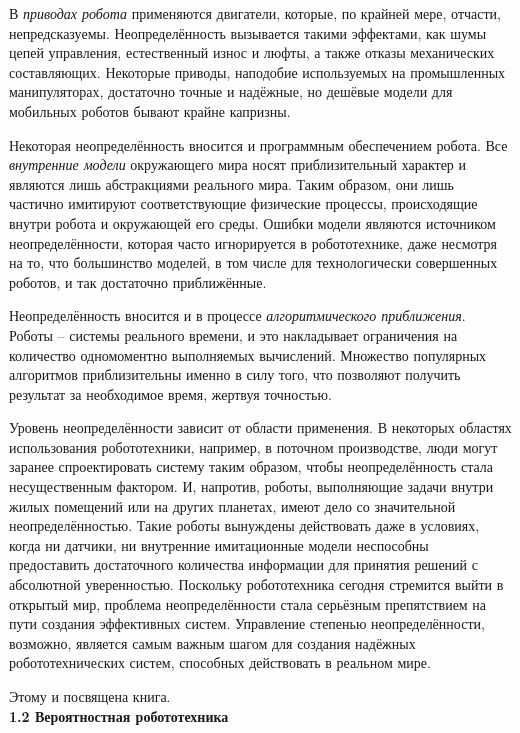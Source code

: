 \documentclass[10pt,a4paper]{article}
\begin{document}
В \textit{приводах робота} применяются двигатели, которые, по крайней мере, отчасти, непредсказуемы. Неопределённость вызывается такими эффектами, как шумы цепей управления, естественный износ и люфты, а также отказы механических составляющих. Некоторые приводы, наподобие используемых на промышленных манипуляторах, достаточно точные и надёжные, но дешёвые модели для мобильных роботов бывают крайне капризны.

Некоторая неопределённость вносится и программным обеспечением робота. Все \textit{внутренние модели} окружающего мира носят приблизительный характер и являются лишь абстракциями реального мира. Таким образом, они лишь частично имитируют соответствующие физические процессы, происходящие внутри робота и окружающей его среды. Ошибки модели являются источником неопределённости, которая часто игнорируется в робототехнике, даже несмотря на то, что большинство моделей, в том числе для технологически совершенных роботов, и так достаточно приближённые.

Неопределённость вносится и в процессе \textit{алгоритмического приближения}. Роботы –  системы реального времени, и это накладывает ограничения на количество одномоментно выполняемых вычислений. Множество популярных алгоритмов приблизительны именно в силу того, что позволяют получить результат за необходимое время, жертвуя точностью.

Уровень неопределённости зависит от области применения. В некоторых областях использования робототехники, например, в поточном производстве, люди могут заранее спроектировать систему таким образом, чтобы неопределённость стала несущественным фактором. И, напротив, роботы, выполняющие задачи внутри жилых помещений или на других планетах, имеют дело со значительной неопределённостью. Такие роботы вынуждены действовать даже в условиях, когда ни датчики, ни внутренние имитационные модели неспособны предоставить достаточного количества информации для принятия решений с абсолютной уверенностью. Поскольку робототехника сегодня стремится выйти в открытый мир, проблема неопределённости стала серьёзным препятствием на пути создания эффективных систем. Управление степенью неопределённости, возможно, является самым важным шагом для создания надёжных робототехнических систем, способных действовать в реальном мире.

Этому и посвящена книга.\\

\textbf{1.2	Вероятностная робототехника}\\
\end{document}
